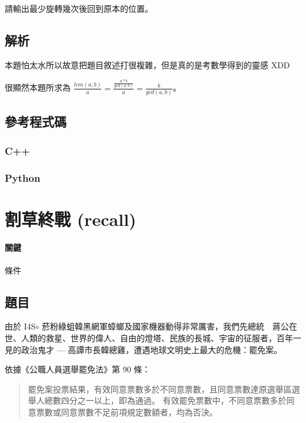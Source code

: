 \documentclass[a4paper,10pt]{article}
\begin{document}
請輸出最少旋轉幾次後回到原本的位置。

\subsection{解析}

本題怕太水所以故意把題目敘述打很複雜，但是真的是考數學得到的靈感 XDD

很顯然本題所求為 $ \frac{lcm(a, b)}{a} = \frac{\frac{a * b}{gcd(a, b)}}{a} = \frac{b}{gcd(a, b)} $。

\subsection{參考程式碼}

\subsubsection{C++}



\subsubsection{Python}



\section{割草終戰 (recall)}

\paragraph{關鍵} 條件

\subsection{題目}

由於 I4S$\circ$ 菸粉綠蛆韓黑網軍蟑螂及國家機器動得非常厲害，我們先總統　蔣公在世、人類的救星、世界的偉人、自由的燈塔、民族的長城、宇宙的征服者，百年一見的政治鬼才 --- 高譚市長韓總雞，遭遇地球文明史上最大的危機：罷免案。

依據《公職人員選舉罷免法》第 90 條：
\begin{quote}
罷免案投票結果，有效同意票數多於不同意票數，且同意票數達原選舉區選舉人總數四分之一以上，即為通過。
有效罷免票數中，不同意票數多於同意票數或同意票數不足前項規定數額者，均為否決。
\end{quote}
\end{document}
